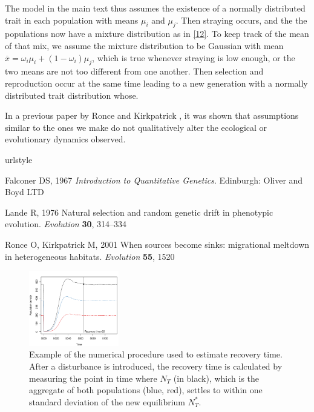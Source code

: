 \documentclass{revtex4}
\begin{document}
The model in the main text thus assumes the existence of a normally distributed trait in each population with means $\mu_{i}$ and $\mu_{j}$. Then straying occurs, and the the populations now have a mixture distribution as in \ref{12}. To keep track of the mean of that mix, we assume the mixture distribution to be Gaussian with mean $\overline{x}=\omega_i \mu_{i}+(1-\omega_i)\mu_{j}$, which is true whenever straying is low enough, or the two means are not too different from one another. Then selection and reproduction occur at the same time leading to a new generation with a normally distributed trait distribution whose.

In a previous paper by Ronce and Kirkpatrick \citep{Ronce:2001dp}, it was shown that assumptions similar to the ones we make do not qualitatively alter the ecological or evolutionary dynamics observed.
 


% 

\begin{thebibliography}{1}
\expandafter\ifx\csname urlstyle\endcsname\relax
  \providecommand{\doi}[1]{doi:\discretionary{}{}{}#1}\else
  \providecommand{\doi}{doi:\discretionary{}{}{}\begingroup
  \urlstyle{rm}\Url}\fi

Falconer DS, 1967 \emph{{Introduction to Quantitative Genetics}}.
\newblock Edinburgh: Oliver and Boyd LTD

Lande R, 1976 {Natural selection and random genetic drift in phenotypic
  evolution}.
\newblock \emph{Evolution} \textbf{30}, 314--334

Ronce O, Kirkpatrick M, 2001 {When sources become sinks: migrational meltdown
  in heterogeneous habitats}.
\newblock \emph{Evolution} \textbf{55}, 1520

\end{thebibliography}


\clearpage

\begin{figure}
  \captionsetup{justification=raggedright,
singlelinecheck=false
}
\centering
\includegraphics[width=0.35\textwidth]{fig_recovery.pdf}
\caption{
Example of the numerical procedure used to estimate recovery time. After a disturbance is introduced, the recovery time is calculated by measuring the point in time where $N_T$ (in black), which is the aggregate of both populations (blue, red), settles to within one standard deviation of the new equilibrium $N_T^*$. 
} \label{fig:recovery}
\end{figure}
\end{document}
